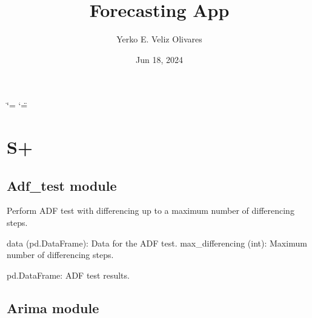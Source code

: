 \documentclass[letterpaper,10pt,english]{sphinxmanual}
\title{Forecasting App}
\date{Jun 18, 2024}
\author{Yerko E.\@{} Veliz Olivares}
\begin{document}
\ifdefined\shorthandoff
  \ifnum\catcode`\=\string=\active\shorthandoff{=}\fi
  \ifnum\catcode`\"=\active{}\fi
\fi

\pagestyle{empty}
\sphinxmaketitle
\pagestyle{plain}
\sphinxtableofcontents
\pagestyle{normal}
\label{\detokenize{index::doc}}


\sphinxstepscope


\chapter{S+}
\label{\detokenize{modules:s}}\label{\detokenize{modules::doc}}
\sphinxstepscope


\section{Adf\_test module}
\label{\detokenize{Adf_test:module-Adf_test}}\label{\detokenize{Adf_test:adf-test-module}}\label{\detokenize{Adf_test::doc}}

\begin{fulllineitems}
\label{\detokenize{Adf_test:Adf_test.perform_adf_test_with_differencing}}
\pysigstartsignatures
{}
\pysigstopsignatures
\sphinxAtStartPar
Perform ADF test with differencing up to a maximum number of differencing steps.
\begin{description}
\sphinxAtStartPar
data (pd.DataFrame): Data for the ADF test.
max\_differencing (int): Maximum number of differencing steps.

\sphinxAtStartPar
pd.DataFrame: ADF test results.

\end{description}

\end{fulllineitems}


\sphinxstepscope


\section{Arima module}
\label{\detokenize{Arima:module-Arima}}\label{\detokenize{Arima:arima-module}}\label{\detokenize{Arima::doc}}
\end{document}
